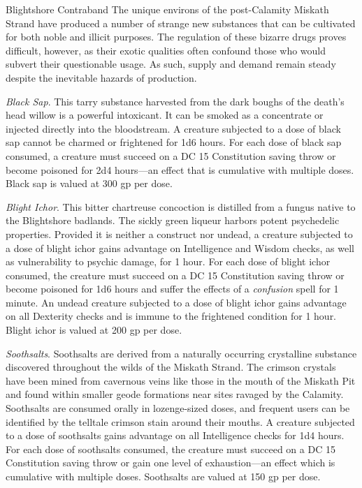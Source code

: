 \documentclass[10pt,a4paper,twoside,bg=print,twocolumn,openany,nodeprecatedcode]{dndbook}
\begin{document}
\begin{DndSidebar}[float=!b]{Blightshore Contraband}
The unique environs of the post-Calamity Miskath Strand have produced a number of strange new substances that can be cultivated for both noble and illicit purposes. The regulation of these bizarre drugs proves difficult, however, as their exotic qualities often confound those who would subvert their questionable usage. As such, supply and demand remain steady despite the inevitable hazards of production.



\textit{Black Sap}. This tarry substance harvested from the dark boughs of the death's head willow is a powerful intoxicant. It can be smoked as a concentrate or injected directly into the bloodstream. A creature subjected to a dose of black sap cannot be charmed or frightened for 1d6 hours. For each dose of black sap consumed, a creature must succeed on a DC 15 Constitution saving throw or become poisoned for 2d4 hours—an effect that is cumulative with multiple doses. Black sap is valued at 300 gp per dose.



\textit{Blight Ichor}. This bitter chartreuse concoction is distilled from a fungus native to the Blightshore badlands. The sickly green liqueur harbors potent psychedelic properties. Provided it is neither a construct nor undead, a creature subjected to a dose of blight ichor gains advantage on Intelligence and Wisdom checks, as well as vulnerability to psychic damage, for 1 hour. For each dose of blight ichor consumed, the creature must succeed on a DC 15 Constitution saving throw or become poisoned for 1d6 hours and suffer the effects of a \textit{confusion} spell for 1 minute. An undead creature subjected to a dose of blight ichor gains advantage on all Dexterity checks and is immune to the frightened condition for 1 hour. Blight ichor is valued at 200 gp per dose.



\textit{Soothsalts}. Soothsalts are derived from a naturally occurring crystalline substance discovered throughout the wilds of the Miskath Strand. The crimson crystals have been mined from cavernous veins like those in the mouth of the Miskath Pit and found within smaller geode formations near sites ravaged by the Calamity. Soothsalts are consumed orally in lozenge-sized doses, and frequent users can be identified by the telltale crimson stain around their mouths. A creature subjected to a dose of soothsalts gains advantage on all Intelligence checks for 1d4 hours. For each dose of soothsalts consumed, the creature must succeed on a DC 15 Constitution saving throw or gain one level of exhaustion—an effect which is cumulative with multiple doses. Soothsalts are valued at 150 gp per dose.



\end{DndSidebar}
\end{document}
